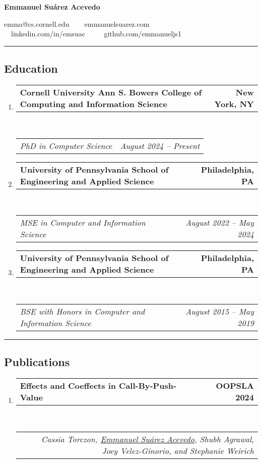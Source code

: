 \documentclass[letterpaper]{article}
\makeatletter
\newcommand*{\tabulardef}[3]{\begin{tabular}[t]{@{}lp{\dimexpr\linewidth-#1}@{}}
    #2&#3
\end{tabular}}
\newcommand{\headerrow}[2]
{\begin{tabular*}{\linewidth}{l@{\extracolsep{\fill}}r}
	#1 &
	#2 \\
\end{tabular*}}
\makeatother
\begin{document}
\begin{center}
{\LARGE \textbf{Emmanuel Suárez Acevedo}}

emma@cs.cornell.edu \ \textbullet
\ \ emmanuelsuarez.com \\

\ \ linkedin.com/in/emsuac \ \ \textbullet
\ \ github.com/emmanueljs1\\
\end{center}
\hrule

\subsection*{Education}
  
\begin{enumerate}[label=]
	\parskip=-0.05em
	\item
	\headerrow
        {\textbf{Cornell University Ann S. Bowers College of Computing and Information Science}}
		{\textbf{New York, NY}}
	\\
	\headerrow
		{\emph{PhD in Computer Science}}
        {\emph{August 2024 -- Present}}

	\item 
	\headerrow
		{\textbf{University of Pennsylvania School of Engineering and Applied Science}}
		{\textbf{Philadelphia, PA}}
	\\
	\headerrow
		{\emph{MSE in Computer and Information Science}}
		{\emph{August 2022 -- May 2024}}

	\item 
	\headerrow
		{\textbf{University of Pennsylvania School of Engineering and Applied Science}}
		{\textbf{Philadelphia, PA}}
	\\
	\headerrow
		{\emph{BSE with Honors in Computer and Information Science}}
		{\emph{August 2015 -- May 2019}}

\end{enumerate}

\hrule
\subsection*{Publications}
  
\begin{enumerate}[label=]
	\parskip=-0.05em
	\item
	\headerrow
        {\textbf{Effects and Coeffects in Call-By-Push-Value}}
		{\textbf{OOPSLA 2024}}
	\\
	\headerrow
        {\tabulardef{6cm}{}{
            \emph{Cassia Torczon, \underline{Emmanuel Suárez Acevedo},
            Shubh Agrawal, Joey Velez-Ginorio, and Stephanie Weirich}}}
        {}
\end{enumerate}
\end{document}

